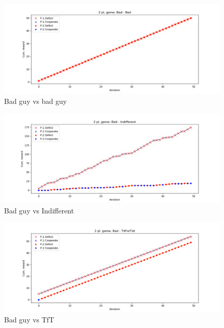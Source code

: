 \documentclass[journal,a4paper,10pt,twoside]{IEEEtran}
\begin{document}
\begin{figure}[ht]
    \centering
    \includegraphics[width=1\columnwidth]{../img/ipd2p-rewards-Bad-Bad.png}
    \caption{Bad guy vs bad guy}
    \label{fig:badvsbad}
\end{figure}

\begin{figure}[ht]
    \centering
    \includegraphics[width=1\columnwidth]{../img/ipd2p-rewards-Bad-Indifferent.png}
    \caption{Bad guy vs Indifferent}
    \label{fig:badvsindiff}
\end{figure}

\begin{figure}[ht]
    \centering
    \includegraphics[width=1\columnwidth]{../img/ipd2p-rewards-Bad-TitForTat.png}
    \caption{Bad guy vs TfT}
    \label{fig:badvstft}
\end{figure}
\end{document}
